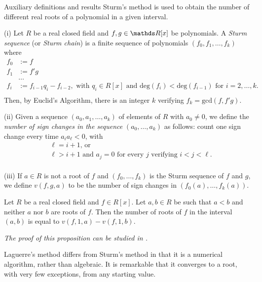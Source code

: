 \documentclass[11pt, a4paper, english, twoside, notitlepage, openright]{report}
\begin{document}
\begin{chapter}{Auxiliary definitions and results}
Sturm's method is used to obtain the number of different real roots of a polynomial in a given interval.

\begin{definitions}\label{sturmSeq} (i) Let $R$ be a real closed field and $f,g\in\R[x]$ be polynomials. A  \emph{Sturm sequence} (or \emph{Sturm chain}) is a finite sequence of polynomials $(f_0, f_1, \dots, f_k)$ where 
\begin{equation*}
\begin{aligned}
f_0 &:= f\\
f_1 &:= f'g\\
& \dots\\
f_i &:= f_{i-1}q_i - f_{i-2}, \text{ with } q_{i}\in R[x] \text{ and } \text{deg}(f_{i}) < \text{deg}(f_{i-1}) \text{ for } i = 2, \dots, k.\\
\end{aligned}
\end{equation*}
	Then, by Euclid's Algorithm, there is an integer $k$ verifying $f_k = \text{gcd}(f, f'g)$.
	
(ii) Given a sequence $(a_0, a_1, \dots, a_k)$ of elements of $R$ with $a_0 \ne 0$, we define the \emph{number of sign changes in the sequence} $(a_0, \dots, a_k)$ as follows: count one sign change every time $a_ia_{\ell} < 0$, with 
\begin{equation*}
\begin{aligned}
&\ell = i + 1 \text{, or }\\
&\ell > i + 1 \text{ and } a_j = 0 \text{ for every } j \text{ verifying  } i < j < \ell.\\ 
\end{aligned}
\end{equation*}

(iii) If $a \in R$ is not a root of $f$ and $(f_0, \dots, f_k)$ is the Sturm sequence of $f$ and $g$, we define $v(f, g, a)$ to be the number of sign changes in $(f_0(a), \dots, f_k(a))$.
\end{definitions}
\begin{proposition}\label{sturm} 
Let $R$ be a real closed field and $f \in R[x]$. Let $a, b \in R$ be such that $a < b$ and neither $a$ nor $b$ are roots of $f$. Then the number of roots of $f$ in the interval $(a, b)$ is equal to $v(f, 1, a) - v(f, 1, b)$.

\em The proof of this proposition can be studied in \cite[1.2.10]{bcr}. \em
\end{proposition}

Laguerre's method differs from Sturm's method in that it is a numerical algorithm, rather than algebraic. It is remarkable that it converges to a root, with very few exceptions, from any starting value.


\end{chapter}
\end{document}
